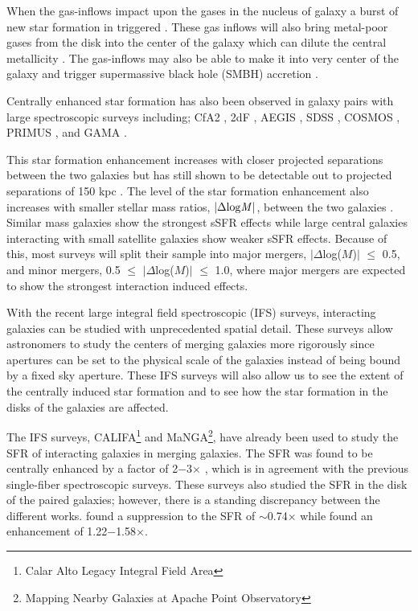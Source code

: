 \documentclass[iop,revtex4,twocolumn,apj,numberedappendix,appendixfloats]{emulateapj}
\begin{document}
When the gas-inflows impact upon the gases in the nucleus of galaxy a burst of new star formation in triggered \citep{Barnes:1996, Mihos:1996}. These gas inflows will also bring metal-poor gases from the disk into the center of the galaxy which can dilute the central metallicity \citep{Rupke:2010, Perez:2011, Scudder:2012}. The gas-inflows may also be able to make it into very center of the galaxy and trigger supermassive black hole (SMBH) accretion \citep{Capelo:2017}. 

Centrally enhanced star formation has also been observed in galaxy pairs with large spectroscopic surveys including; CfA2  \citep{Barton:2000, Woods:2006}, 2dF \citep{Lambas:2003}, AEGIS \citep{Lin:2007}, SDSS \citep{Ellison:2008}, COSMOS \citep{Kartaltepe:2007,Xu:2012}, PRIMUS \citep{Wong:2011}, and GAMA \citep{Robotham:2014}.

This star formation enhancement increases with closer projected separations between the two galaxies \citep{Ellison:2008, Scudder:2012} but has still shown to be detectable out to projected separations of 150 kpc \citep{Patton:2013}. The level of the star formation enhancement also increases with smaller stellar mass ratios, $|\Delta {\rm log} {\it M} |$, between the two galaxies \citep{Ellison:2008}. Similar mass galaxies show the strongest sSFR effects while large central galaxies interacting with small satellite galaxies show weaker sSFR effects. Because of this, most surveys will split their sample into major mergers, $|\Delta$log($M$)$|$ $\le$ 0.5, and minor mergers, 0.5 $\le$ $|\Delta$log($M$)$|$ $\le$ 1.0, where major mergers are expected to show the strongest interaction induced effects. 

With the recent large integral field spectroscopic (IFS) surveys, interacting galaxies can be studied with unprecedented spatial detail. These surveys allow astronomers to study the centers of merging galaxies more rigorously since apertures can be set to the physical scale of the galaxies instead of being bound by a fixed sky aperture. These IFS surveys will also allow us to see the extent of the centrally induced star formation and to see how the star formation in the disks of the galaxies are affected. 

The IFS surveys, CALIFA\footnote{Calar Alto Legacy Integral Field Area} and MaNGA\footnote{Mapping Nearby Galaxies at Apache Point Observatory}, have already been used to study the SFR of interacting galaxies in merging galaxies. The SFR was found to be centrally enhanced by a factor of 2$-$3$\times$ \citep{Barrera-Ballesteros:2015, Pan:2019}, which is in agreement with the previous single-fiber spectroscopic surveys. These surveys also studied the SFR in the disk of the paired galaxies; however, there is a standing discrepancy between the different works. \citet{Barrera-Ballesteros:2015} found a suppression to the SFR of $\sim$0.74$\times$ while \citet{Pan:2019} found an enhancement of 1.22$-$1.58$\times$. 
\end{document}
